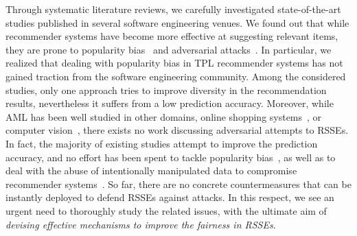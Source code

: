 Through systematic literature reviews, we carefully investigated state-of-the-art studies published in several software engineering venues. We found out that while recommender systems have become more effective at suggesting relevant items, they are prone to popularity bias~\cite{10174041} and adversarial attacks~\cite{10.1145/3463274.3463809,9678946}. %
In particular, we realized that dealing with popularity bias in TPL recommender systems has not gained traction from the software engineering community. Among the considered studies, only one approach tries to improve diversity in the recommendation results, nevertheless it suffers from a low prediction accuracy. Moreover, while AML has been well studied in other domains, \eg online shopping systems~\cite{10.1145/3336191.3371877,10.1007/s10462-012-9364-9}, or computer vision~\cite{conf/cvpr/NguyenYC15}, there exists no work discussing adversarial attempts to RSSEs. In fact, the majority of existing studies %
attempt to improve the prediction accuracy, and no effort has been spent to tackle popularity bias~\cite{10174041}, %
as well as to deal with the abuse of intentionally manipulated data to compromise recommender systems~\cite{9678946,10.1145/3463274.3463809}. So far, there are no concrete countermeasures that can be instantly deployed to defend RSSEs against attacks. 
In this respect, we see an urgent need to thoroughly study the related issues, %
with the ultimate aim of \emph{devising effective mechanisms to improve the fairness in RSSEs}.

















